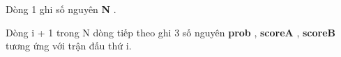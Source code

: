 Dòng 1 ghi số nguyên \textbf{ N } .

Dòng i + 1 trong N dòng tiếp theo ghi 3 số nguyên \textbf{ prob } , \textbf{ scoreA } , \textbf{ scoreB } tương ứng với trận đấu thứ i.